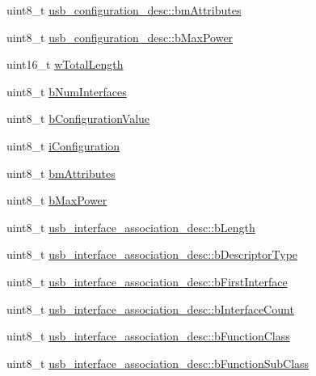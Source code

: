 \begin{DoxyCompactItemize}
\item 
uint8\-\_\-t \hyperlink{group___p_i_o_s___u_s_b___d_e_f_s_ga76649c01c303d92feff0e4c3767d02ac}{usb\-\_\-configuration\-\_\-desc\-::bm\-Attributes}
\item 
uint8\-\_\-t \hyperlink{group___p_i_o_s___u_s_b___d_e_f_s_gaf57a5d3898006764248c6c40130c3d90}{usb\-\_\-configuration\-\_\-desc\-::b\-Max\-Power}
\item 
uint16\-\_\-t \hyperlink{group___p_i_o_s___u_s_b___d_e_f_s_ga866c5d9bb8a60f25805d37b7a5b5f9e8}{w\-Total\-Length}
\item 
uint8\-\_\-t \hyperlink{group___p_i_o_s___u_s_b___d_e_f_s_ga1ad144333e75b0d867e72f8a337cd510}{b\-Num\-Interfaces}
\item 
uint8\-\_\-t \hyperlink{group___p_i_o_s___u_s_b___d_e_f_s_gaecb9ae30bca0b044d2941120f21c2b29}{b\-Configuration\-Value}
\item 
uint8\-\_\-t \hyperlink{group___p_i_o_s___u_s_b___d_e_f_s_ga5ad4440b4eb1935d66b154d274f8a272}{i\-Configuration}
\item 
uint8\-\_\-t \hyperlink{group___p_i_o_s___u_s_b___d_e_f_s_gae7c63b4cda39953db5710012a5d91c6f}{bm\-Attributes}
\item 
uint8\-\_\-t \hyperlink{group___p_i_o_s___u_s_b___d_e_f_s_gad3ac74420252d7a6a03e1e9d7b481f9b}{b\-Max\-Power}
\item 
uint8\-\_\-t \hyperlink{group___p_i_o_s___u_s_b___d_e_f_s_gac2df51916afa2daee6b2cd5084aa9b65}{usb\-\_\-interface\-\_\-association\-\_\-desc\-::b\-Length}
\item 
uint8\-\_\-t \hyperlink{group___p_i_o_s___u_s_b___d_e_f_s_gab9d86ba47450d51a49e1b25684970e4e}{usb\-\_\-interface\-\_\-association\-\_\-desc\-::b\-Descriptor\-Type}
\item 
uint8\-\_\-t \hyperlink{group___p_i_o_s___u_s_b___d_e_f_s_ga5301f325d65bec1bea2bf370c1a753ea}{usb\-\_\-interface\-\_\-association\-\_\-desc\-::b\-First\-Interface}
\item 
uint8\-\_\-t \hyperlink{group___p_i_o_s___u_s_b___d_e_f_s_gae55742862ae442a25fc810abbfae15ef}{usb\-\_\-interface\-\_\-association\-\_\-desc\-::b\-Interface\-Count}
\item 
uint8\-\_\-t \hyperlink{group___p_i_o_s___u_s_b___d_e_f_s_ga29a82765e766cecea56a883db16dd78e}{usb\-\_\-interface\-\_\-association\-\_\-desc\-::b\-Function\-Class}
\item 
uint8\-\_\-t \hyperlink{group___p_i_o_s___u_s_b___d_e_f_s_ga8bd62c9bba867dfd7abbba86be72499f}{usb\-\_\-interface\-\_\-association\-\_\-desc\-::b\-Function\-Sub\-Class}

\end{DoxyCompactItemize}
